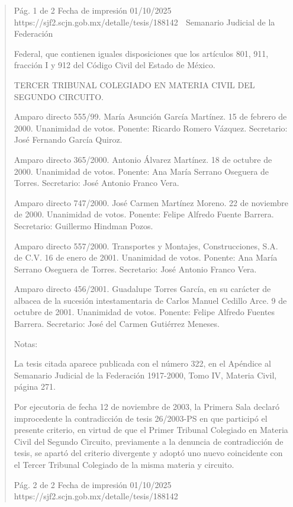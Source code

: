 \documentclass[11pt,a4paper]{article}
\begin{document}
\begin{quote}
                                             Pág. 1 de 2              Fecha de impresión 01/10/2025
  https://sjf2.scjn.gob.mx/detalle/tesis/188142
                                                  Semanario Judicial de la Federación

Federal, que contienen iguales disposiciones que los artículos 801, 911, fracción I y 912 del Código
Civil del Estado de México.

TERCER TRIBUNAL COLEGIADO EN MATERIA CIVIL DEL SEGUNDO CIRCUITO.


Amparo directo 555/99. María Asunción García Martínez. 15 de febrero de 2000. Unanimidad de
votos. Ponente: Ricardo Romero Vázquez. Secretario: José Fernando García Quiroz.

Amparo directo 365/2000. Antonio Álvarez Martínez. 18 de octubre de 2000. Unanimidad de votos.
Ponente: Ana María Serrano Oseguera de Torres. Secretario: José Antonio Franco Vera.

Amparo directo 747/2000. José Carmen Martínez Moreno. 22 de noviembre de 2000. Unanimidad
de votos. Ponente: Felipe Alfredo Fuente Barrera. Secretario: Guillermo Hindman Pozos.

Amparo directo 557/2000. Transportes y Montajes, Construcciones, S.A. de C.V. 16 de enero de
2001. Unanimidad de votos. Ponente: Ana María Serrano Oseguera de Torres. Secretario: José
Antonio Franco Vera.

Amparo directo 456/2001. Guadalupe Torres García, en su carácter de albacea de la sucesión
intestamentaria de Carlos Manuel Cedillo Arce. 9 de octubre de 2001. Unanimidad de votos.
Ponente: Felipe Alfredo Fuentes Barrera. Secretario: José del Carmen Gutiérrez Meneses.

Notas:

La tesis citada aparece publicada con el número 322, en el Apéndice al Semanario Judicial de la
Federación 1917-2000, Tomo IV, Materia Civil, página 271.

Por ejecutoria de fecha 12 de noviembre de 2003, la Primera Sala declaró improcedente la
contradicción de tesis 26/2003-PS en que participó el presente criterio, en virtud de que el Primer
Tribunal Colegiado en Materia Civil del Segundo Circuito, previamente a la denuncia de
contradicción de tesis, se apartó del criterio divergente y adoptó uno nuevo coincidente con el
Tercer Tribunal Colegiado de la misma materia y circuito.




                                             Pág. 2 de 2            Fecha de impresión 01/10/2025
  https://sjf2.scjn.gob.mx/detalle/tesis/188142

\end{quote}
\end{document}
